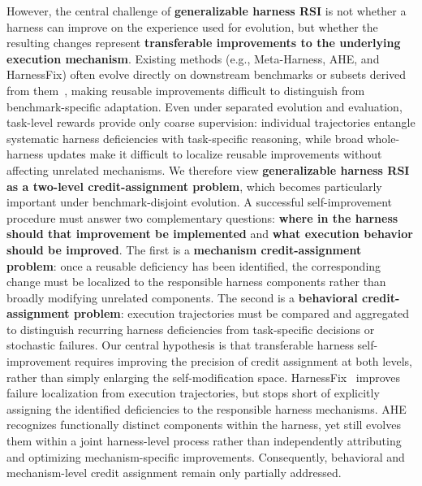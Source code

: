 \documentclass{article} %
\begin{document}
However, the central challenge of \textbf{generalizable harness RSI} is not whether a harness can improve on the experience used for evolution, but whether the resulting changes represent \textbf{transferable improvements to the underlying execution mechanism}. Existing methods  (e.g., Meta-Harness, AHE, and HarnessFix)  often evolve directly on downstream benchmarks or subsets derived from them~\citep{lee2026meta,lin2026agentic,du2026livingharnessinteractiveagentevolver,chen2026failed,pan2026evolvingagentsdarkretrospective,nguyen2026recursiveselfevolvingagentsheldout}, making reusable improvements difficult to distinguish from benchmark-specific adaptation. Even under separated evolution and evaluation, task-level rewards provide only coarse supervision: individual trajectories entangle systematic harness deficiencies with task-specific reasoning, while broad whole-harness updates make it difficult to localize reusable improvements without affecting unrelated mechanisms.
We therefore view \textbf{generalizable harness RSI as a two-level credit-assignment problem}, which becomes particularly important under benchmark-disjoint evolution.
A successful self-improvement procedure must answer two complementary questions: \textbf{where in the harness should that improvement be implemented} and \textbf{what execution behavior should be improved}. 
The first is a \textbf{mechanism credit-assignment problem}: once a reusable deficiency has been identified, the corresponding change must be localized to the responsible harness components rather than broadly modifying unrelated components.
The second is a \textbf{behavioral credit-assignment problem}: execution trajectories must be compared and aggregated to distinguish recurring harness deficiencies from task-specific decisions or stochastic failures. 
Our central hypothesis is that transferable harness self-improvement requires improving the precision of credit assignment at both levels, rather than simply enlarging the self-modification space.
HarnessFix~\citep{chen2026failed} improves failure localization from execution trajectories, but stops short of explicitly assigning the identified deficiencies to the responsible harness mechanisms. AHE~\citep{lin2026agentic} recognizes functionally distinct components within the harness, yet still evolves them within a joint harness-level process rather than independently attributing and optimizing mechanism-specific improvements. Consequently, behavioral and mechanism-level credit assignment remain only partially addressed.
\end{document}
